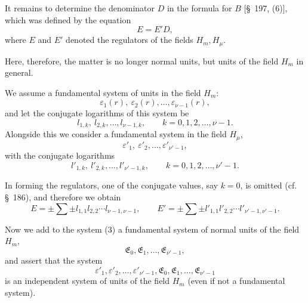\documentclass[11pt]{article}
\begin{document}
It remains to determine the denominator $D$ in the formula for $B$ [\S~197, (6)], which was defined by the equation
\[
E=E'D,
\]
where $E$ and $E'$ denoted the regulators of the fields $H_m,H_\mu$.

Here, therefore, the matter is no longer normal units, but units of the field $H_m$ in general.

We assume a fundamental system of units in the field $H_m$:
\begin{equation}
\varepsilon_1(r),\ \varepsilon_2(r),\ldots,\varepsilon_{\nu-1}(r),
\tag{1}
\end{equation}
and let the conjugate logarithms of this system be
\begin{equation}
l_{1,k},\ l_{2,k},\ldots,l_{\nu-1,k},\qquad k=0,1,2,\ldots,\nu-1.
\tag{2}
\end{equation}
Alongside this we consider a fundamental system in the field $H_\mu$,
\begin{equation}
\varepsilon'_1,\ \varepsilon'_2,\ldots,\varepsilon'_{\nu'-1},
\tag{3}
\end{equation}
with the conjugate logarithms
\begin{equation}
l'_{1,k},\ l'_{2,k},\ldots,l'_{\nu'-1,k},\qquad k=0,1,2,\ldots,\nu'-1.
\tag{4}
\end{equation}

In forming the regulators, one of the conjugate values, say $k=0$, is omitted (cf. \S~186), and therefore we obtain
\begin{equation}
E=\pm\sum\pm l_{1,1}l_{2,2}\cdots l_{\nu-1,\nu-1},
\qquad
E'=\pm\sum\pm l'_{1,1}l'_{2,2}\cdots l'_{\nu'-1,\nu'-1}.
\tag{5}
\end{equation}

Now we add to the system (3) a fundamental system of normal units of the field $H_m$,
\begin{equation}
\mathfrak E_0,\mathfrak E_1,\ldots,\mathfrak E_{\nu'-1},
\tag{6}
\end{equation}
and assert that the system
\begin{equation}
\varepsilon'_1,\varepsilon'_2,
\ldots,\varepsilon'_{\nu'-1},\mathfrak E_0,\mathfrak E_1,
\ldots,\mathfrak E_{\nu'-1}
\tag{7}
\end{equation}
is an independent system of units of the field $H_m$ (even if not a fundamental system).
\end{document}
